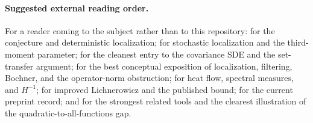 \documentclass[../../main.tex]{subfiles}
\begin{document}
\paragraph{Suggested external reading order.}
For a reader coming to the subject rather than to this repository:
\cite{KannanLovaszSimonovits1995} for the conjecture and deterministic localization;
\cite{Eldan2013ThinShell} for stochastic localization and the third-moment parameter;
\cite{LeeVempala2018,LeeVempala2024} for the cleanest entry to the covariance SDE and the
set-transfer argument; \cite{KLnotes} for the best conceptual exposition of localization,
filtering, Bochner, and the operator-norm obstruction; \cite{KlartagLehec2022Polylog} for heat
flow, spectral measures, and $H^{-1}$; \cite{Klartag2023Logarithmic} for improved Lichnerowicz and
the published bound; \cite{Letwin2026QuadraticKLS} for the current preprint record; and
\cite{KlartagLehec2025ThinShell,ChenKlartag2026SharpThinShell} for the strongest related tools and
the clearest illustration of the quadratic-to-all-functions gap.
\end{document}
